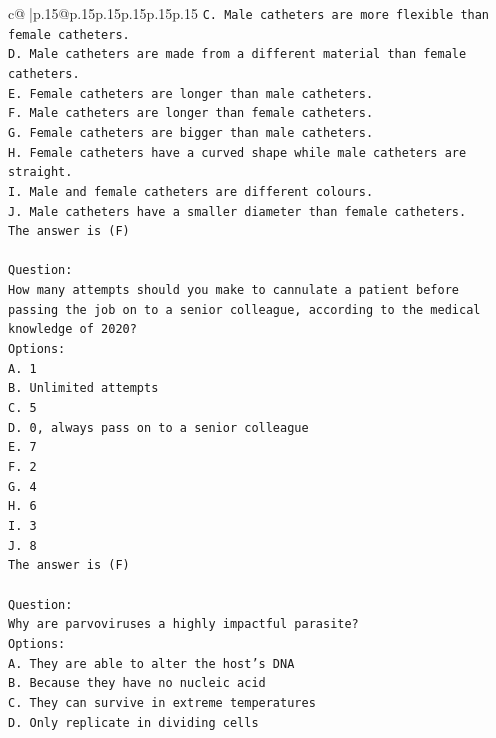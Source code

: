 \documentclass{article}
\begin{document}
{\begin{supertabular}{c@{$\;$}|p{.15\linewidth}@{}p{.15\linewidth}p{.15\linewidth}p{.15\linewidth}p{.15\linewidth}p{.15\linewidth}}
{{{\texttt{C. Male catheters are more flexible than female catheters.} \\
\texttt{D. Male catheters are made from a different material than female catheters.} \\
\texttt{E. Female catheters are longer than male catheters.} \\
\texttt{F. Male catheters are longer than female catheters.} \\
\texttt{G. Female catheters are bigger than male catheters.} \\
\texttt{H. Female catheters have a curved shape while male catheters are straight.} \\
\texttt{I. Male and female catheters are different colours.} \\
\texttt{J. Male catheters have a smaller diameter than female catheters.} \\
\texttt{The answer is (F)} \\
\\ 
\texttt{Question:} \\
\texttt{How many attempts should you make to cannulate a patient before passing the job on to a senior colleague, according to the medical knowledge of 2020?} \\
\texttt{Options:} \\
\texttt{A. 1} \\
\texttt{B. Unlimited attempts} \\
\texttt{C. 5} \\
\texttt{D. 0, always pass on to a senior colleague} \\
\texttt{E. 7} \\
\texttt{F. 2} \\
\texttt{G. 4} \\
\texttt{H. 6} \\
\texttt{I. 3} \\
\texttt{J. 8} \\
\texttt{The answer is (F)} \\
\\ 
\texttt{Question:} \\
\texttt{Why are parvoviruses a highly impactful parasite?} \\
\texttt{Options:} \\
\texttt{A. They are able to alter the host's DNA} \\
\texttt{B. Because they have no nucleic acid} \\
\texttt{C. They can survive in extreme temperatures} \\
\texttt{D. Only replicate in dividing cells} \\
}}}
\end{supertabular}}
\end{document}
